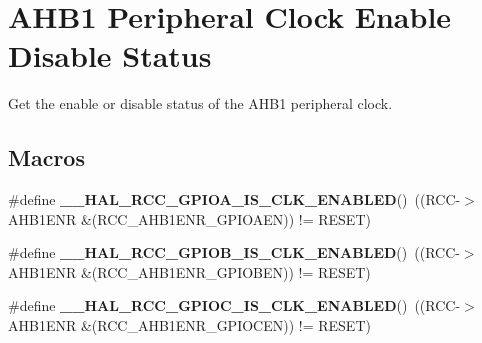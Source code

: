 \hypertarget{group___r_c_c___a_h_b1___peripheral___clock___enable___disable___status}{}\section{A\+H\+B1 Peripheral Clock Enable Disable Status}
\label{group___r_c_c___a_h_b1___peripheral___clock___enable___disable___status}


Get the enable or disable status of the A\+H\+B1 peripheral clock.  


\subsection*{Macros}
\begin{DoxyCompactItemize}
\item 
\mbox{\label{group___r_c_c___a_h_b1___peripheral___clock___enable___disable___status_gad1edbd9407c814110f04c1a609a214e4}} 
\#define {\bfseries \+\_\+\+\_\+\+H\+A\+L\+\_\+\+R\+C\+C\+\_\+\+G\+P\+I\+O\+A\+\_\+\+I\+S\+\_\+\+C\+L\+K\+\_\+\+E\+N\+A\+B\+L\+ED}()~((R\+CC-\/$>$A\+H\+B1\+E\+NR \&(R\+C\+C\+\_\+\+A\+H\+B1\+E\+N\+R\+\_\+\+G\+P\+I\+O\+A\+EN)) != R\+E\+S\+ET)
\item 
\mbox{\label{group___r_c_c___a_h_b1___peripheral___clock___enable___disable___status_ga2fc8f9dc5f5b64c14c325c45ee301b4f}} 
\#define {\bfseries \+\_\+\+\_\+\+H\+A\+L\+\_\+\+R\+C\+C\+\_\+\+G\+P\+I\+O\+B\+\_\+\+I\+S\+\_\+\+C\+L\+K\+\_\+\+E\+N\+A\+B\+L\+ED}()~((R\+CC-\/$>$A\+H\+B1\+E\+NR \&(R\+C\+C\+\_\+\+A\+H\+B1\+E\+N\+R\+\_\+\+G\+P\+I\+O\+B\+EN)) != R\+E\+S\+ET)
\item 
\mbox{\label{group___r_c_c___a_h_b1___peripheral___clock___enable___disable___status_ga528029c120a0154dfd7cfd6159e8debe}} 
\#define {\bfseries \+\_\+\+\_\+\+H\+A\+L\+\_\+\+R\+C\+C\+\_\+\+G\+P\+I\+O\+C\+\_\+\+I\+S\+\_\+\+C\+L\+K\+\_\+\+E\+N\+A\+B\+L\+ED}()~((R\+CC-\/$>$A\+H\+B1\+E\+NR \&(R\+C\+C\+\_\+\+A\+H\+B1\+E\+N\+R\+\_\+\+G\+P\+I\+O\+C\+EN)) != R\+E\+S\+ET)
\item 
\mbox{\label{group___r_c_c___a_h_b1___peripheral___clock___enable___disable___status_ga8e182ed43301e2586bc198a729b50436}} 

\end{DoxyCompactItemize}
